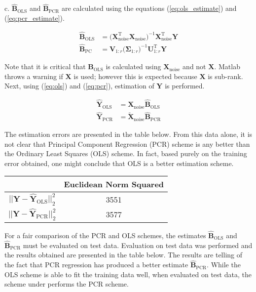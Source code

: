 \noindent{}c. $\hat{\textbf{B}}_{\text{OLS}}$ and $\hat{\textbf{B}}_{\text{PCR}}$ are calculated using the equations (\ref{eq:ols_estimate}) and (\ref{eq:pcr_estimate}). 


\begin{align}
\hat{\textbf{B}}_{\text{OLS}} &= \bigg(\textbf{X}_{\text{noise}}^{\text{T}}\textbf{X}_{\text{noise}}\bigg)^{-1} \textbf{X}_{\text{noise}}^{\text{T}}\textbf{Y} \label{eq:ols_estimate}\\
\hat{\textbf{B}}_{\text{PC}} &= \textbf{V}_{1:r}\bigg(\bm{\Sigma}_{1:r}\bigg)^{-1}\textbf{U}_{1:r}^{\text{T}}\textbf{Y} \label{eq:pcr_estimate}
\end{align} 

\noindent{}Note that it is critical that $\hat{\textbf{B}}_{\text{OLS}}$ is calculated using $\textbf{X}_{\text{noise}}$ and not $\textbf{X}$. Matlab throws a warning if $\textbf{X}$ is used; however this is expected because $\textbf{X}$ is sub-rank. Next, using (\ref{eq:ols}) and (\ref{eq:pcr}), estimation of $\textbf{Y}$ is performed. 


\begin{align}
\hat{\textbf{Y}}_{\text{OLS}}&=\textbf{X}_{\text{noise}}\hat{\textbf{B}}_{\text{OLS}}\label{eq:ols}\\
\hat{\textbf{Y}}_{\text{PCR}}&=\tilde{\textbf{X}}_{\text{noise}}\hat{\textbf{B}}_{\text{PCR}}\label{eq:pcr}
\end{align}

\noindent{}The estimation errors are presented in the table below. From this data alone, it is not clear that Principal Component Regression (PCR) scheme is any better than the Ordinary Least Squares (OLS) scheme. In fact, based purely on the training error obtained, one might conclude that OLS is a better estimation scheme.

\begin{table}[H]
\tabulinesep=0.9mm
\centering
\begin{tabu}{c|c|}
                                           & Euclidean Norm Squared \\ \hline
{}	& 3551		\\ \hline
{}	& 3577		\\ \hline
\end{tabu}
\end{table}

\noindent{}For a fair comparison of the PCR and OLS schemes, the estimates $\hat{\textbf{B}}_{\text{OLS}}$ and $\hat{\textbf{B}}_{\text{PCR}}$ must be evaluated on test data. Evaluation on test data was performed and the results obtained are presented in the table below. The results are telling of the fact that PCR regression has produced a better estimate $\hat{\textbf{B}}_{\text{PCR}}$. While the OLS scheme is able to fit the training data well, when evaluated on test data, the scheme under performs the PCR scheme. 


